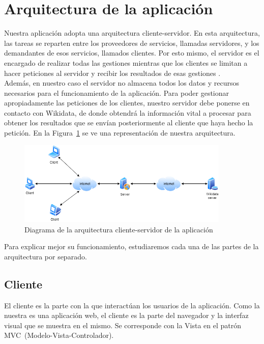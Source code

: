 \section{Arquitectura de la aplicación}

Nuestra aplicación adopta una arquitectura cliente-servidor. En esta arquitectura, las tareas se reparten entre los proveedores de servicios, llamadas servidores, y los demandantes de esos servicios, llamados clientes. Por esto mismo, el servidor es el encargado de realizar todas las gestiones mientras que los clientes se limitan a hacer peticiones al servidor y recibir los resultados de esas gestiones \cite{reese2000}.\\

Además, en nuestro caso el servidor no almacena todos los datos y recursos necesarios para el funcionamiento de la aplicación. Para poder gestionar apropiadamente las peticiones de los clientes, nuestro servidor debe ponerse en contacto con Wikidata, de donde obtendrá la información vital a procesar para obtener los resultados que se envían posteriormente al cliente que haya hecho la petición. En la Figura~\ref{fig:diagramaCS} se ve una representación de nuestra arquitectura.\\

\begin{figure}[h!]
	\centering
	\includegraphics[width = 0.9\textwidth]{Imagenes/Bitmap/Diagrama cliente servidor.png}
	\caption{Diagrama de la arquitectura cliente-servidor de la aplicación}
	\label{fig:diagramaCS}
\end{figure}

Para explicar mejor su funcionamiento, estudiaremos cada una de las partes de la arquitectura por separado.\\

\subsection{Cliente}

El cliente es la parte con la que interactúan los usuarios de la aplicación. Como la nuestra es una aplicación web, el cliente es la parte del navegador y la interfaz visual que se muestra en el mismo. Se corresponde con la Vista en el patrón MVC~(Modelo-Vista-Controlador).\\


